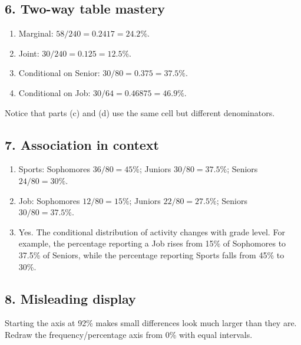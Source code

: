 \documentclass[11pt]{article}
\newcommand{\ans}[1]{\textcolor{AnswerBlue}{#1}}
\begin{document}
\subsection*{6. Two-way table mastery}
\begin{answerbox}
\begin{enumerate}[label=\alph*.]
  \item \ans{Marginal: $58/240=0.2417=24.2\%$.}
  \item \ans{Joint: $30/240=0.125=12.5\%$.}
  \item \ans{Conditional on Senior: $30/80=0.375=37.5\%$.}
  \item \ans{Conditional on Job: $30/64=0.46875=46.9\%$.}
\end{enumerate}
Notice that parts (c) and (d) use the same cell but different denominators.
\end{answerbox}

\subsection*{7. Association in context}
\begin{answerbox}
\begin{enumerate}[label=\alph*.]
  \item \ans{Sports: Sophomores $36/80=45\%$; Juniors $30/80=37.5\%$; Seniors $24/80=30\%$.}
  \item \ans{Job: Sophomores $12/80=15\%$; Juniors $22/80=27.5\%$; Seniors $30/80=37.5\%$.}
  \item \ans{Yes. The conditional distribution of activity changes with grade level. For example, the percentage reporting a Job rises from 15\% of Sophomores to 37.5\% of Seniors, while the percentage reporting Sports falls from 45\% to 30\%.}
\end{enumerate}
\end{answerbox}

\subsection*{8. Misleading display}
\begin{answerbox}
\ans{Starting the axis at 92\% makes small differences look much larger than they are. Redraw the frequency/percentage axis from 0\% with equal intervals.}
\end{answerbox}

\newpage
\end{document}
